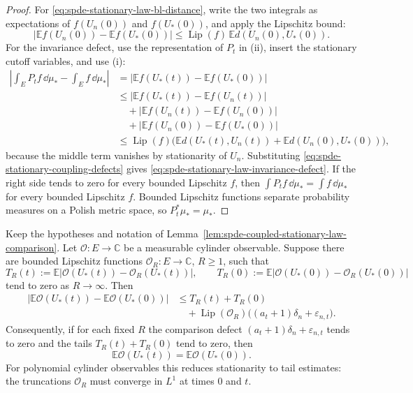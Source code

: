 \begin{proof}
For \eqref{eq:spde-stationary-law-bl-distance}, write the two integrals as
expectations of \(f(U_n(0))\) and \(f(U_\ast(0))\), and apply the Lipschitz
bound:
\[
  |\mathbb E f(U_n(0))-\mathbb E f(U_\ast(0))|
  \leq
  \operatorname{Lip}(f)\,\mathbb E d(U_n(0),U_\ast(0)).
\]
For the invariance defect, use the representation of \(P_t\) in (ii), insert
the stationary cutoff variables, and use (i):
\[
\begin{aligned}
  \left|
    \int_E P_tf\,\dd\mu_\ast-\int_E f\,\dd\mu_\ast
  \right|
  &=
  |\mathbb E f(U_\ast(t))-\mathbb E f(U_\ast(0))|\\
  &\leq
  |\mathbb E f(U_\ast(t))-\mathbb E f(U_n(t))|\\
  &\quad+
  |\mathbb E f(U_n(t))-\mathbb E f(U_n(0))|\\
  &\quad+
  |\mathbb E f(U_n(0))-\mathbb E f(U_\ast(0))|\\
  &\leq
  \operatorname{Lip}(f)
  \bigl(\mathbb E d(U_\ast(t),U_n(t))
       +\mathbb E d(U_n(0),U_\ast(0))\bigr),
\end{aligned}
\]
because the middle term vanishes by stationarity of \(U_n\).  Substituting
\eqref{eq:spde-stationary-coupling-defects} gives
\eqref{eq:spde-stationary-law-invariance-defect}.  If the right side tends
to zero for every bounded Lipschitz \(f\), then
\(\int P_tf\,\dd\mu_\ast=\int f\,\dd\mu_\ast\) for every bounded Lipschitz
\(f\).  Bounded Lipschitz functions separate probability measures on a
Polish metric space, so \(P_t^\ast\mu_\ast=\mu_\ast\).
\end{proof}

\begin{lemma}
\label{lem:spde-polynomial-stationarity-truncation}
Keep the hypotheses and notation of
Lemma~\ref{lem:spde-coupled-stationary-law-comparison}.  Let
\(\mathcal O:E\to\mathbb C\) be a measurable cylinder observable.  Suppose
there are bounded Lipschitz functions \(\mathcal O_R:E\to\mathbb C\),
\(R\geq1\), such that
\[
  T_R(t):=
  \mathbb E|\mathcal O(U_\ast(t))-\mathcal O_R(U_\ast(t))|,
  \qquad
  T_R(0):=
  \mathbb E|\mathcal O(U_\ast(0))-\mathcal O_R(U_\ast(0))|
\]
tend to zero as \(R\to\infty\).  Then
\begin{equation}
\begin{aligned}
  \left|
    \mathbb E\mathcal O(U_\ast(t))
    -\mathbb E\mathcal O(U_\ast(0))
  \right|
  &\leq
  T_R(t)+T_R(0)  \\
  &\quad+
  \operatorname{Lip}(\mathcal O_R)
  \bigl((a_t+1)\delta_n+\varepsilon_{n,t}\bigr).
\end{aligned}
  \label{eq:spde-polynomial-stationarity-truncation-bound}
\end{equation}
Consequently, if for each fixed \(R\) the comparison defect
\((a_t+1)\delta_n+\varepsilon_{n,t}\) tends to zero and the tails
\(T_R(t)+T_R(0)\) tend to zero, then
\[
  \mathbb E\mathcal O(U_\ast(t))
  =
  \mathbb E\mathcal O(U_\ast(0)).
\]
For polynomial cylinder observables this reduces stationarity to tail
estimates: the truncations \(\mathcal O_R\) must converge in \(L^1\)
at times \(0\) and \(t\).
\end{lemma}

